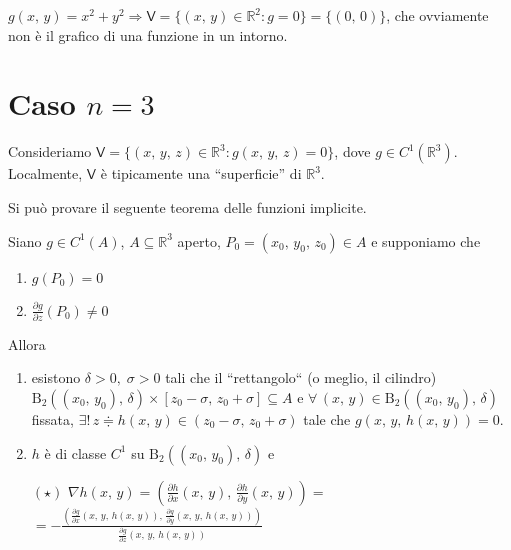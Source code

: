 \begin{example}
$g(x,\,y) = x^2 + y^2 \Longrightarrow \mathsf{V} = \lbrace (x,\,y) \in \mathbb{R}^2 : g = 0 \rbrace = \lbrace (0,\,0) \rbrace$, che ovviamente non è il grafico di una funzione in un intorno.
\end{example}



\section{Caso $n=3$}
Consideriamo $\mathsf{V} = \lbrace (x,\,y,\,z) \in \mathbb{R}^3 : g(x,\,y,\,z) = 0 \rbrace$, dove $g \in C^1(\mathbb{R}^3)$. Localmente, $\mathsf{V}$ è tipicamente una ``superficie'' di $\mathbb{R}^3$.
\begin{center}
\def\svgwidth{7cm}

\end{center}

Si può provare il seguente teorema delle funzioni implicite.

\begin{thm}
Siano $g \in C^1(A)$, $A \subseteq \mathbb{R}^3$ aperto, $P_0 = (x_0,\,y_0,\,z_0) \in A$ e supponiamo che
\begin{enumerate}[labelindent=\parindent,leftmargin=*,label=\textnormal{(\roman*)},start=1]
\item $g(P_0) = 0$
\item $\displaystyle \frac{\partial g}{\partial z}(P_0) \neq 0$
\end{enumerate}
Allora
\begin{enumerate}[labelindent=\parindent,leftmargin=*,label=\textnormal{(D\arabic*)},start=1]
\item esistono $\delta > 0,\; \sigma > 0$ tali che il ``rettangolo`` (o meglio, il cilindro) $\mathrm{B}_2((x_0,\,y_0),\,\delta) \times [z_0 - \sigma,\, z_0 + \sigma] \subseteq A$ e $\forall \, (x,\,y) \in \mathrm{B}_2((x_0,\,y_0),\,\delta)$ fissata, $\exists ! \, z \doteqdot h(x,\,y) \in (z_0 - \sigma,\,z_0 + \sigma)$ tale che $g(x,\,y,\,h(x,\,y)) = 0$.

\item $h$ è di classe $C^1$ su $\mathrm{B}_2((x_0,\,y_0),\,\delta)$ e
\begin{center}
$\mathrm{(\star)}$
\hfill
$\displaystyle
\nabla h(x,\,y) = \left( \frac{\partial h}{\partial x}(x,	\,y),\,\frac{\partial h}{\partial y}(x,	\,y) \right) = $\hfill \null\vskip 0pt\hfill
$= - \frac{ \left(
\displaystyle \frac{\partial g}{\partial x} \left( x,\,y,\,h(x,\,y) \right),\,
\displaystyle \frac{\partial g}{\partial y} \left( x,\,y,\,h(x,\,y) \right)
\right) }{
\displaystyle \frac{\partial g}{\partial z} \left( x,\,y,\,h(x,\,y) \right)
}
$
\hfill \null \\
\end{center}
\end{enumerate}
\begin{center}
\def\svgwidth{12cm}

\end{center}
\end{thm}

